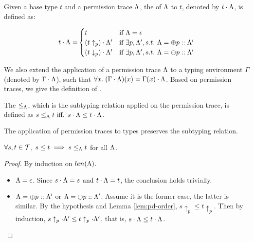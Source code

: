 {{{\begin{definition}\label{def:app-pt-t}
Given a base type $t$ and a permission trace $\Lambda$, the  of $\Lambda$ to $t$, denoted by $t\cdot\Lambda$,  is defined as:

\begin{equation*}
{t\cdot \ensuremath{\Lambda}=}
\begin{cases}
t & {\normalfont\text{if}}~\Lambda = \epsilon\\
(t\uparrow_{p})\cdot \Lambda' & {\normalfont\text{if}}~\exists p, \Lambda', s.t.~\Lambda = \oplus p :: \Lambda'\\
(t\downarrow_{p})\cdot \Lambda' & {\normalfont\text{if}}~\exists p, \Lambda', s.t.~\Lambda = \ominus p :: \Lambda'
\end{cases}
\end{equation*}
\end{definition}

We also extend the application of a permission trace $\Lambda$ to a typing environment $\Gamma$ (denoted by $\Gamma\cdot\Lambda$), such that $\forall x.\; (\Gamma\cdot{\ensuremath{\Lambda}})(x) = \Gamma(x)\cdot \Lambda$.
Based on permission traces, we give the definition of .
\begin{definition}\label{def:partial-subtype}
The  $\leq_{\Lambda} $, which is the subtyping relation applied on the permission trace, is defined as $s\leq_{\Lambda}  t \text{ iff. } s\cdot \Lambda \leq t\cdot \Lambda$.
\end{definition}

The application of permission traces to types preserves the subtyping relation. 
\begin{lemma}\label{lem:monotrace}
$\forall s, t \in \mathcal{T}$, $s\leq t \implies s\leq_{\Lambda} t$ for all $\Lambda$.
\end{lemma}
\begin{proof}
By induction on $len(\Lambda)$.\\
\begin{itemize}
\item $\Lambda=\epsilon$.
Since $s\cdot\Lambda=s$ and $t\cdot\Lambda=t$, the conclusion holds trivially.
\item
$\Lambda=\oplus p :: \Lambda'$ or $\Lambda=\ominus p :: \Lambda'$. Assume it is the former case, the latter is similar.
By the hypothesis and Lemma \ref{lem:pd-order}, $s\uparrow_{p}\leq t\uparrow_{p}$.
Then by induction, $s\uparrow_{p}\cdot\Lambda'\leq t\uparrow_{p}\cdot\Lambda'$,
that is, $s\cdot\Lambda\leq t\cdot\Lambda$.
\end{itemize}
\end{proof}


}}}
